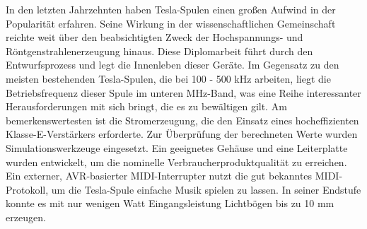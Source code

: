 In den letzten Jahrzehnten haben Tesla-Spulen einen großen Aufwind in der Popularität erfahren. Seine Wirkung in der wissenschaftlichen Gemeinschaft reichte weit über den beabsichtigten Zweck der Hochspannungs- und Röntgenstrahlenerzeugung hinaus. Diese Diplomarbeit führt durch den Entwurfsprozess und legt die Innenleben dieser Geräte. Im Gegensatz zu den meisten bestehenden Tesla-Spulen, die bei 100 - 500 kHz arbeiten, liegt die Betriebsfrequenz dieser Spule im unteren MHz-Band, was eine Reihe interessanter Herausforderungen mit sich bringt, die es zu bewältigen gilt. Am bemerkenswertesten ist die Stromerzeugung, die den Einsatz eines hocheffizienten Klasse-E-Verstärkers erforderte. Zur Überprüfung der berechneten Werte wurden Simulationswerkzeuge eingesetzt. Ein geeignetes Gehäuse und eine Leiterplatte wurden entwickelt, um die nominelle Verbraucherproduktqualität zu erreichen. Ein externer, AVR-basierter MIDI-Interrupter nutzt die gut bekanntes MIDI-Protokoll, um die Tesla-Spule einfache Musik spielen zu lassen. In seiner Endstufe konnte es mit nur wenigen Watt Eingangsleistung Lichtbögen bis zu 10 mm erzeugen.